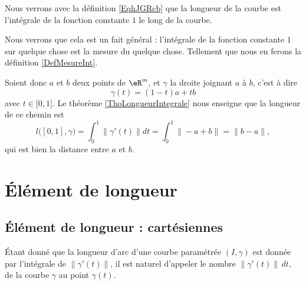 \begin{remark}  \label{RemLongIntUn}
    Nous verrons avec la définition \eqref{EqhJGRcb} que la longueur de la courbe est l'intégrale de la fonction constante \( 1\) le long de la courbe.

    Nous verrons que cela est un fait général : l'intégrale de la fonction constante \( 1\) sur quelque chose est la mesure du quelque chose. Tellement que nous en ferons la définition \ref{DefMesureInt}.
\end{remark}

\begin{example}
Soient donc $a$ et $b$ deux points de $\eR^m$, et $\gamma$ la droite joignant $a$ à $b$, c'est à dire
\begin{equation}
    \gamma(t)=(1-t)a+tb
\end{equation}
avec $t\in\mathopen[ 0 , 1 \mathclose]$. Le théorème \ref{ThoLongueurIntegrale} nous enseigne que la longueur de ce chemin est
\begin{equation}
    l\big( [0,1],\gamma \big)=\int_0^1\| \gamma'(t) \|dt=\int_0^1\| -a+b \|=\| b-a \|,
\end{equation}
qui est bien la distance entre $a$ et $b$.
\end{example}

\section{Élément de longueur}

\subsection{Élément de longueur : cartésiennes}

Étant donné que la longueur d'arc d'une courbe paramétrée $(I,\gamma)$ est donnée par l'intégrale de $\| \gamma'(t) \|$, il est naturel d'appeler le nombre $\| \gamma'(t) \|\,dt$,  de la courbe $\gamma$ au point $\gamma(t)$.


